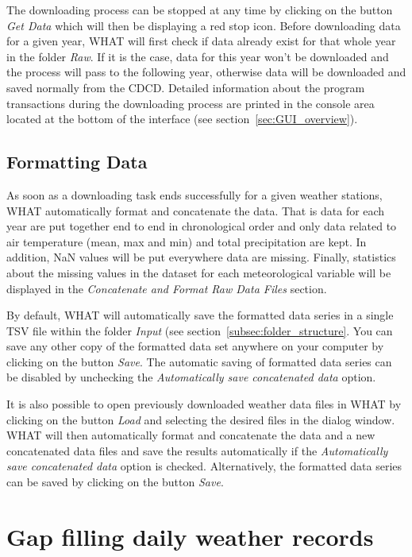 \documentclass[WHATMANUAL.tex]{subfiles}
\begin{document}
The downloading process can be stopped at any time by clicking on the button \emph{Get Data} which will then be displaying a red stop icon. Before downloading data for a given year, WHAT will first check if data already exist for that whole year in the folder \emph{Raw}. If it is the case, data for this year won't be downloaded and the process will pass to the following year, otherwise data will be downloaded and saved normally from the CDCD. Detailed information about the program transactions during the downloading process are printed in the console area located at the bottom of the interface (see section~\ref{sec:GUI_overview}).

\subsection{Formatting Data}

As soon as a downloading task ends successfully for a given weather stations, WHAT automatically format and concatenate the data. That is data for each year are put together end to end in chronological order and only data related to air temperature (mean, max and min) and total precipitation are kept. In addition, NaN values will be put everywhere data are missing. Finally, statistics about the missing values in the dataset for each meteorological variable will be displayed in the \emph{Concatenate and Format Raw Data Files} section.

By default, WHAT will automatically save the formatted data series in a single TSV file within the folder \emph{Input} (see section~\ref{subsec:folder_structure}. You can save any other copy of the formatted data set anywhere on your computer by clicking on the button \emph{Save}. The automatic saving of formatted data series can be disabled by unchecking the \emph{Automatically save concatenated data} option. 

It is also possible to open previously downloaded weather data files in WHAT by clicking on the button \emph{Load} and selecting the desired files in the dialog window. WHAT will then automatically format and concatenate the data and a new concatenated data files and save the results automatically if the \emph{Automatically save concatenated data} option is checked. Alternatively, the formatted data series can be saved by clicking on the button \emph{Save}.

\section{Gap filling daily weather records}
\end{document}
